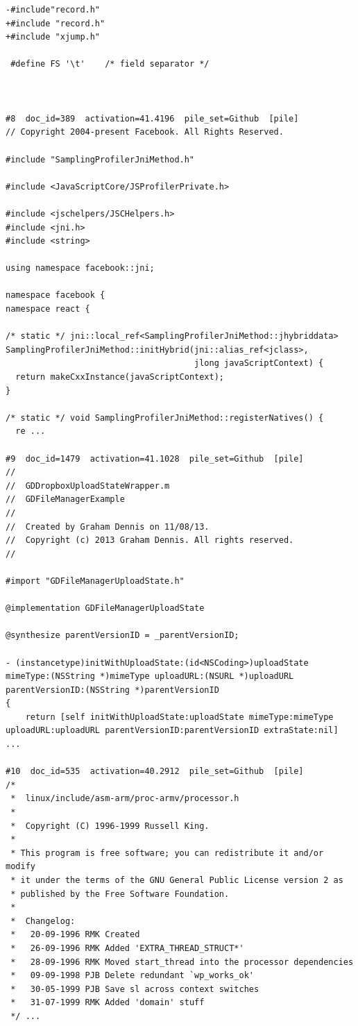 \begin{verbatim}
-#include"record.h"
+#include "record.h"
+#include "xjump.h"
 
 #define FS	'\t'	/* field separator */
 


#8  doc_id=389  activation=41.4196  pile_set=Github  [pile]
// Copyright 2004-present Facebook. All Rights Reserved.

#include "SamplingProfilerJniMethod.h"

#include <JavaScriptCore/JSProfilerPrivate.h>

#include <jschelpers/JSCHelpers.h>
#include <jni.h>
#include <string>

using namespace facebook::jni;

namespace facebook {
namespace react {

/* static */ jni::local_ref<SamplingProfilerJniMethod::jhybriddata>
SamplingProfilerJniMethod::initHybrid(jni::alias_ref<jclass>,
                                      jlong javaScriptContext) {
  return makeCxxInstance(javaScriptContext);
}

/* static */ void SamplingProfilerJniMethod::registerNatives() {
  re ...

#9  doc_id=1479  activation=41.1028  pile_set=Github  [pile]
//
//  GDDropboxUploadStateWrapper.m
//  GDFileManagerExample
//
//  Created by Graham Dennis on 11/08/13.
//  Copyright (c) 2013 Graham Dennis. All rights reserved.
//

#import "GDFileManagerUploadState.h"

@implementation GDFileManagerUploadState

@synthesize parentVersionID = _parentVersionID;

- (instancetype)initWithUploadState:(id<NSCoding>)uploadState mimeType:(NSString *)mimeType uploadURL:(NSURL *)uploadURL parentVersionID:(NSString *)parentVersionID
{
    return [self initWithUploadState:uploadState mimeType:mimeType uploadURL:uploadURL parentVersionID:parentVersionID extraState:nil] ...

#10  doc_id=535  activation=40.2912  pile_set=Github  [pile]
/*
 *  linux/include/asm-arm/proc-armv/processor.h
 *
 *  Copyright (C) 1996-1999 Russell King.
 *
 * This program is free software; you can redistribute it and/or modify
 * it under the terms of the GNU General Public License version 2 as
 * published by the Free Software Foundation.
 *
 *  Changelog:
 *   20-09-1996	RMK	Created
 *   26-09-1996	RMK	Added 'EXTRA_THREAD_STRUCT*'
 *   28-09-1996	RMK	Moved start_thread into the processor dependencies
 *   09-09-1998	PJB	Delete redundant `wp_works_ok'
 *   30-05-1999	PJB	Save sl across context switches
 *   31-07-1999	RMK	Added 'domain' stuff
 */ ...


\end{verbatim}
